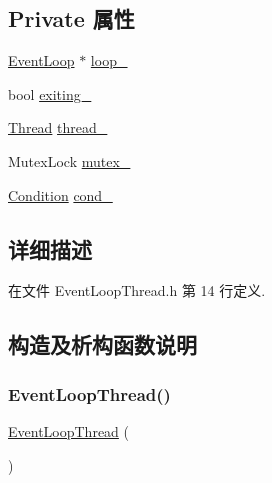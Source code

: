 \subsection*{Private 属性}
\begin{DoxyCompactItemize}
\item 
\hyperlink{classmuduo_1_1EventLoop}{Event\+Loop} $\ast$ \hyperlink{classmuduo_1_1EventLoopThread_a19968f50018d32ac31f5cba0195591ac}{loop\+\_\+}
\item 
bool \hyperlink{classmuduo_1_1EventLoopThread_a1bead9a84f504b31f1abe7b85e3443cb}{exiting\+\_\+}
\item 
\hyperlink{classmuduo_1_1Thread}{Thread} \hyperlink{classmuduo_1_1EventLoopThread_ad920b8087250a686bfa5a9805170974a}{thread\+\_\+}
\item 
Mutex\+Lock \hyperlink{classmuduo_1_1EventLoopThread_a6e1bf1809a42f40f1a21178dc6620a6f}{mutex\+\_\+}
\item 
\hyperlink{classmuduo_1_1Condition}{Condition} \hyperlink{classmuduo_1_1EventLoopThread_ab88e8d399cbe9cffda0afb02110faa59}{cond\+\_\+}
\end{DoxyCompactItemize}


\subsection{详细描述}


在文件 Event\+Loop\+Thread.\+h 第 14 行定义.



\subsection{构造及析构函数说明}
\mbox{\label{classmuduo_1_1EventLoopThread_aa866d54bfe4557884ede5d7800865753}} 
\subsubsection{\texorpdfstring{Event\+Loop\+Thread()}{EventLoopThread()}}
{\footnotesize\ttfamily \hyperlink{classmuduo_1_1EventLoopThread}{Event\+Loop\+Thread} (\begin{DoxyParamCaption}{ }\end{DoxyParamCaption})}



